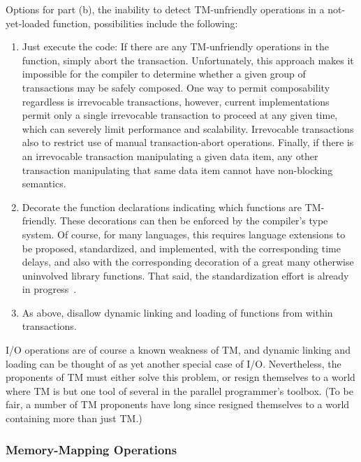 Options for part (b), the inability to detect TM-unfriendly operations
in a not-yet-loaded function, possibilities include the following:

\begin{enumerate}
\item	Just execute the code:
	If there are any TM-unfriendly operations in the function,
	simply abort the transaction.
	Unfortunately, this approach makes it impossible for the compiler
	to determine whether a given group of transactions may be safely
	composed.
	One way to permit composability regardless is irrevocable
	transactions, however, current implementations permit only a
	single irrevocable transaction to proceed at any given time,
	which can severely limit performance and scalability.
	Irrevocable transactions also to restrict use of manual
	transaction-abort operations.
	Finally, if there is an irrevocable transaction manipulating
	a given data item, any other transaction manipulating that
	same data item cannot have non-blocking semantics.
\item	Decorate the function declarations indicating which functions
	are TM-friendly.
	These decorations can then be enforced by the compiler's type system.
	Of course, for many languages, this requires language extensions
	to be proposed, standardized, and implemented, with the
	corresponding time delays, and also with the corresponding
	decoration of a great many otherwise uninvolved library functions.
	That said, the standardization effort is already in
	progress~\cite{Ali-Reza-Adl-Tabatabai2009CppTM,Ali-Reza-Adl-Tabatabai2012CppTM}.
\item	As above, disallow dynamic linking and loading of functions from
	within transactions.
\end{enumerate}

I/O operations are of course a known weakness of TM, and dynamic linking
and loading can be thought of as yet another special case of I/O\@.
Nevertheless, the proponents of TM must either solve this problem, or
resign themselves to a world where TM is but one tool of several in the
parallel programmer's toolbox.
(To be fair, a number of TM proponents have long since resigned themselves
to a world containing more than just TM.)

\subsubsection{Memory-Mapping Operations}
\label{sec:future:Memory-Mapping Operations}

